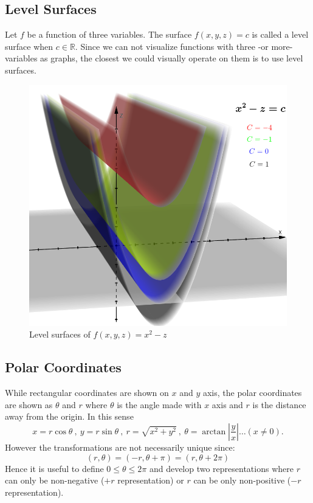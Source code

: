 \documentclass[12pt]{article}
\begin{document}
\newpage
\subsection{Level Surfaces}
Let $f$ be a function of three variables. The surface $f(x,y,z)=c$ is called a level surface when $c\in\mathbb{R}$. Since we can not visualize functions with three -or more- variables as graphs, the closest we could visually operate on them is to use level surfaces.


\begin{figure}[H]
\centering
\includegraphics[scale=0.66]{levelsurf.png}
\caption{Level surfaces of $f(x,y,z)=x^2-z$}
\end{figure}

\newpage
\subsection{Polar Coordinates}
While rectangular coordinates are shown on $x$ and $y$ axis, the polar coordinates are shown as $\theta$ and $r$ where $\theta$ is the angle made with $x$ axis and $r$ is the distance away from the origin. In this sense $$x=r \cos \theta \ ,\ y=r \sin \theta \ ,\ r=\sqrt{x^2+y^2} \ , \ \theta = \arctan |\frac{y}{x}| \ldots(x\neq 0).$$
However the transformations are not necessarily unique since: 
$$(r,\theta)=(-r,\theta +\pi)= (r,\theta +2\pi )$$
Hence it is useful to define $0 \leq \theta \leq 2\pi$ and develop two representations where $r$ can only be non-negative ($+r$ representation) or $r$ can be only non-positive ($-r$ representation).
\end{document}
